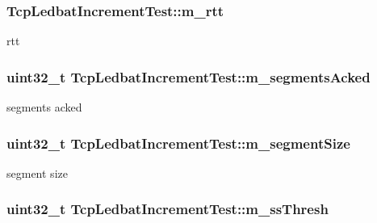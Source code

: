 \subsubsection[{\texorpdfstring{m\+\_\+rtt}{m_rtt}}]{ Tcp\+Ledbat\+Increment\+Test\+::m\+\_\+rtt\hspace{0.3cm}{\ttfamily [private]}}\hypertarget{classTcpLedbatIncrementTest_a843cb713ab4901fa84ee69d64ad4aac6}{}\label{classTcpLedbatIncrementTest_a843cb713ab4901fa84ee69d64ad4aac6}


rtt 

\subsubsection[{\texorpdfstring{m\+\_\+segments\+Acked}{m_segmentsAcked}}]{\setlength{\rightskip}{0pt plus 5cm}uint32\+\_\+t Tcp\+Ledbat\+Increment\+Test\+::m\+\_\+segments\+Acked\hspace{0.3cm}{\ttfamily [private]}}\hypertarget{classTcpLedbatIncrementTest_a3335fb51edf1a6f05f4f55e12ab6409f}{}\label{classTcpLedbatIncrementTest_a3335fb51edf1a6f05f4f55e12ab6409f}


segments acked 

\subsubsection[{\texorpdfstring{m\+\_\+segment\+Size}{m_segmentSize}}]{\setlength{\rightskip}{0pt plus 5cm}uint32\+\_\+t Tcp\+Ledbat\+Increment\+Test\+::m\+\_\+segment\+Size\hspace{0.3cm}{\ttfamily [private]}}\hypertarget{classTcpLedbatIncrementTest_a5cd6fa8c5676d842df33b20100c75397}{}\label{classTcpLedbatIncrementTest_a5cd6fa8c5676d842df33b20100c75397}


segment size 

\subsubsection[{\texorpdfstring{m\+\_\+ss\+Thresh}{m_ssThresh}}]{\setlength{\rightskip}{0pt plus 5cm}uint32\+\_\+t Tcp\+Ledbat\+Increment\+Test\+::m\+\_\+ss\+Thresh\hspace{0.3cm}{\ttfamily [private]}}\hypertarget{classTcpLedbatIncrementTest_a90b485375adb0be49054c206802267fe}{}\label{classTcpLedbatIncrementTest_a90b485375adb0be49054c206802267fe}


